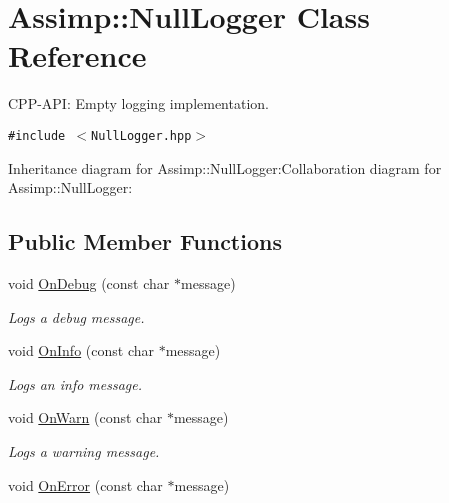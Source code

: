 \hypertarget{class_assimp_1_1_null_logger}{
\section{Assimp::NullLogger Class Reference}
\label{class_assimp_1_1_null_logger}
}
CPP-API: Empty logging implementation.  


{\tt \#include $<$NullLogger.hpp$>$}

Inheritance diagram for Assimp::NullLogger:Collaboration diagram for Assimp::NullLogger:\subsection*{Public Member Functions}
\begin{CompactItemize}
\item 
\hypertarget{class_assimp_1_1_null_logger_f354ebbd382b7097a55d364794a45631}{
void \hyperlink{class_assimp_1_1_null_logger_f354ebbd382b7097a55d364794a45631}{OnDebug} (const char $\ast$message)}
\label{class_assimp_1_1_null_logger_f354ebbd382b7097a55d364794a45631}

\begin{CompactList}\small\item\em Logs a debug message. \item\end{CompactList}\item 
\hypertarget{class_assimp_1_1_null_logger_12d2b0048d17a819c8c00277ad1394c5}{
void \hyperlink{class_assimp_1_1_null_logger_12d2b0048d17a819c8c00277ad1394c5}{OnInfo} (const char $\ast$message)}
\label{class_assimp_1_1_null_logger_12d2b0048d17a819c8c00277ad1394c5}

\begin{CompactList}\small\item\em Logs an info message. \item\end{CompactList}\item 
\hypertarget{class_assimp_1_1_null_logger_9a04c2b9e3d4bc9eec8f693ed8115f24}{
void \hyperlink{class_assimp_1_1_null_logger_9a04c2b9e3d4bc9eec8f693ed8115f24}{OnWarn} (const char $\ast$message)}
\label{class_assimp_1_1_null_logger_9a04c2b9e3d4bc9eec8f693ed8115f24}

\begin{CompactList}\small\item\em Logs a warning message. \item\end{CompactList}\item 
\hypertarget{class_assimp_1_1_null_logger_4fbf66103757fafcff891fb04b4ee714}{
void \hyperlink{class_assimp_1_1_null_logger_4fbf66103757fafcff891fb04b4ee714}{OnError} (const char $\ast$message)}
\label{class_assimp_1_1_null_logger_4fbf66103757fafcff891fb04b4ee714}


\end{CompactItemize}

